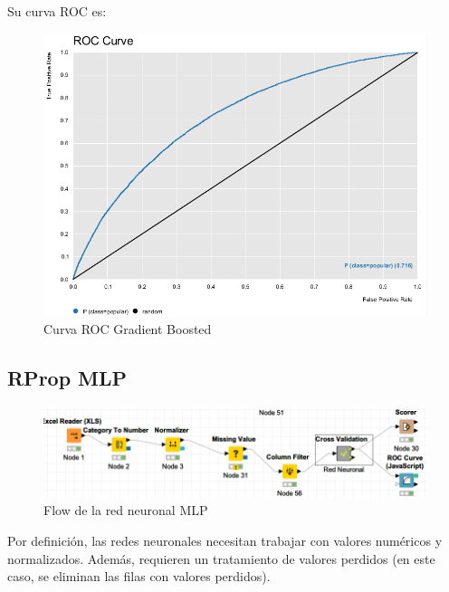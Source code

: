 Su curva ROC es:

\begin{figure}[H] %
	\centering
	\includegraphics[scale=0.38]{roc-gb-p.png}  %
	\caption{Curva ROC Gradient Boosted} 
	\label{fig:rocgb-p}
\end{figure}

\subsection{RProp MLP}

\begin{figure}[H] %
	\centering
	\includegraphics[scale=0.4]{flow-rn-p.png}  %
	\caption{Flow de la red neuronal MLP} 
	\label{fig:flow-rn-p}
\end{figure}

Por definición, las redes neuronales necesitan trabajar con valores numéricos y normalizados. Además, requieren un tratamiento de valores perdidos (en este caso, se eliminan las filas con valores perdidos).\\

